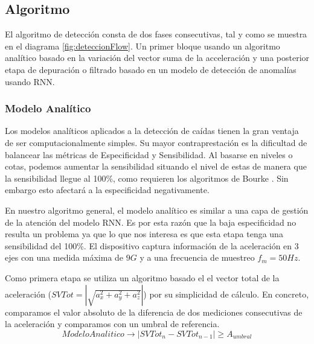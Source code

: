\subsection{Algoritmo}\label{desc_modelo}

El algoritmo de detección consta de dos fases consecutivas, tal y como se muestra en el diagrama \ref{fig:deteccionFlow}. Un primer bloque usando un algoritmo analítico basado en la variación del vector suma de la acceleración y una posterior etapa de depuración o filtrado basado en un modelo de detección de anomalías usando RNN.


\subsubsection{Modelo Analítico}

Los modelos analíticos aplicados a la detección de caídas tienen la gran ventaja de ser computacionalmente simples. Su mayor contraprestación es la dificultad de balancear las métricas de Especificidad y Sensibilidad. Al basarse en niveles o cotas, podemos aumentar la sensibilidad situando el nivel de estas de manera que la sensibilidad llegue al 100\%, como requieren los algoritmos de Bourke\cite{Bourke2006} . Sin embargo esto afectará a la especificidad negativamente\cite{Aziz2017}.


En nuestro algoritmo general, el modelo analítico es similar a una capa de gestión de la atención del modelo RNN. Es por esta razón que la baja especificidad  no resulta un problema ya que lo que nos interesa es que esta etapa tenga una sensibilidad del 100\%. El dispositivo captura información de la aceleración en 3 ejes con una medida máxima de $9G$ y a una frecuencia de muestreo $f_m=50Hz$.

Como primera etapa se utiliza un algoritmo basado el el vector total de la aceleración ($SVTot = |\sqrt{a_{x}^2+a_{y}^2+a_{z}^2}|$) por su simplicidad de cálculo. En concreto, comparamos el valor absoluto de la diferencia de dos mediciones consecutivas de la aceleración y comparamos con un umbral de referencia.
\[
ModeloAnalitico\rightarrow |SVTot_n - SVTot_{n-1}|\geq A_{umbral}
\]

